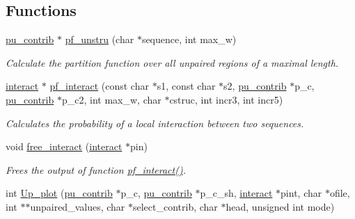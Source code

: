 \subsection*{Functions}
\begin{DoxyCompactItemize}
\item 
\mbox{\hyperlink{group__data__structures_structpu__contrib}{pu\+\_\+contrib}} $\ast$ \mbox{\hyperlink{group__up__cofold_ga5b4ee40e190d2f633cd01cf0d2fe93cf}{pf\+\_\+unstru}} (char $\ast$sequence, int max\+\_\+w)
\begin{DoxyCompactList}\small\item\em Calculate the partition function over all unpaired regions of a maximal length. \end{DoxyCompactList}\item 
\mbox{\hyperlink{group__data__structures_structinteract}{interact}} $\ast$ \mbox{\hyperlink{group__up__cofold_ga1aa0aa02bc3a724f87360c03097afd00}{pf\+\_\+interact}} (const char $\ast$s1, const char $\ast$s2, \mbox{\hyperlink{group__data__structures_structpu__contrib}{pu\+\_\+contrib}} $\ast$p\+\_\+c, \mbox{\hyperlink{group__data__structures_structpu__contrib}{pu\+\_\+contrib}} $\ast$p\+\_\+c2, int max\+\_\+w, char $\ast$cstruc, int incr3, int incr5)
\begin{DoxyCompactList}\small\item\em Calculates the probability of a local interaction between two sequences. \end{DoxyCompactList}\item 
void \mbox{\hyperlink{group__up__cofold_gadde308fd5f696dc271b1532aa96fd12f}{free\+\_\+interact}} (\mbox{\hyperlink{group__data__structures_structinteract}{interact}} $\ast$pin)
\begin{DoxyCompactList}\small\item\em Frees the output of function \mbox{\hyperlink{group__up__cofold_ga1aa0aa02bc3a724f87360c03097afd00}{pf\+\_\+interact()}}. \end{DoxyCompactList}\item 
int \mbox{\hyperlink{group__up__cofold_ga73efd2918cbbb2cdf44422653f996852}{Up\+\_\+plot}} (\mbox{\hyperlink{group__data__structures_structpu__contrib}{pu\+\_\+contrib}} $\ast$p\+\_\+c, \mbox{\hyperlink{group__data__structures_structpu__contrib}{pu\+\_\+contrib}} $\ast$p\+\_\+c\+\_\+sh, \mbox{\hyperlink{group__data__structures_structinteract}{interact}} $\ast$pint, char $\ast$ofile, int $\ast$$\ast$unpaired\+\_\+values, char $\ast$select\+\_\+contrib, char $\ast$head, unsigned int mode)
\item 
$$
\end{DoxyCompactItemize}
